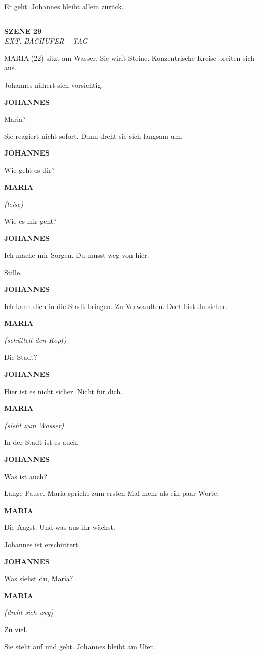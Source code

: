 \documentclass[11pt,a4paper,twoside]{book}
\newcommand{\szene}[2]{%
    \vspace{1em}
    \noindent\textbf{\textsf{#1}}\\
    \textit{#2}
    \vspace{0.5em}
}
\newcommand{\figur}[1]{%
    \vspace{0.5em}
    \noindent\hspace{3cm}\textbf{\MakeUppercase{#1}}\\
    \hspace{3cm}
}
\newcommand{\regieanweisung}[1]{%
    \textit{(#1)}
}
\begin{document}
Er geht. Johannes bleibt allein zurück.

\vspace{1em}
\hrule
\vspace{1em}

\szene{SZENE 29}{EXT. BACHUFER -- TAG}

MARIA (22) sitzt am Wasser. Sie wirft Steine. Konzentrische Kreise breiten sich aus.

Johannes nähert sich vorsichtig.

\begin{dialogbox}
\figur{Johannes}
Maria?
\end{dialogbox}

Sie reagiert nicht sofort. Dann dreht sie sich langsam um.

\begin{dialogbox}
\figur{Johannes}
Wie geht es dir?

\figur{Maria}
\regieanweisung{leise}
Wie es mir geht?

\figur{Johannes}
Ich mache mir Sorgen. Du musst weg von hier.
\end{dialogbox}

Stille.

\begin{dialogbox}
\figur{Johannes}
Ich kann dich in die Stadt bringen. Zu Verwandten. Dort bist du sicher.

\figur{Maria}
\regieanweisung{schüttelt den Kopf}
Die Stadt?

\figur{Johannes}
Hier ist es nicht sicher. Nicht für dich.

\figur{Maria}
\regieanweisung{sieht zum Wasser}
In der Stadt ist es auch.

\figur{Johannes}
Was ist auch?
\end{dialogbox}

Lange Pause. Maria spricht zum ersten Mal mehr als ein paar Worte.

\begin{dialogbox}
\figur{Maria}
Die Angst. Und was aus ihr wächst.
\end{dialogbox}

Johannes ist erschüttert.

\begin{dialogbox}
\figur{Johannes}
Was siehst du, Maria?

\figur{Maria}
\regieanweisung{dreht sich weg}
Zu viel.
\end{dialogbox}

Sie steht auf und geht. Johannes bleibt am Ufer.
\end{document}
